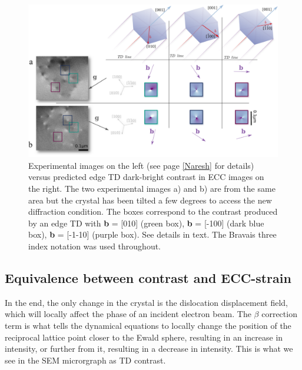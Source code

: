 \clearpage
\begin{figure}
    \centering
    \includegraphics[width=0.9\linewidth]{Figures/contrast.png}
    \caption[Predicted contrast comparison with experiments.]{ Experimental images on the left (see page \ref{Naresh} for details) versus predicted edge TD dark-bright contrast in ECC images on the right. The two experimental images a) and b) are from the same area but the crystal has been tilted a few degrees to access the new diffraction condition. The boxes correspond to the contrast produced by an edge TD with \textbf{b} = [010] (green box),\textbf{ b} = [-100] (dark blue box), \textbf{b} = [-1-10] (purple box). See details in text. The Bravais three index notation was used throughout.}
    \label{fig:contrast}
\end{figure}
\clearpage




\subsection{Equivalence between contrast and ECC-strain}

In the end, the only change in the crystal is the dislocation displacement field, which will  locally affect the phase of an incident electron beam. The $\beta$ correction term is what tells the dynamical equations to locally change the position of the reciprocal lattice point closer to the Ewald sphere, resulting in an increase in intensity, or further from it, resulting in a decrease in intensity. This is what we see in the SEM microrgraph as TD contrast. 

